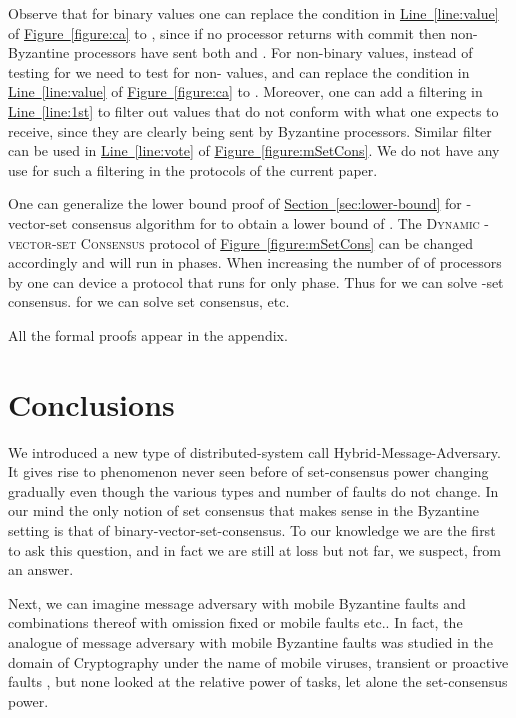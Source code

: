 \documentclass[11pt]{article}
\newcommand{\namedref}[2]{\hyperref[#2]{#1~\ref*{#2}}}
\newcommand{\sectionref}[1]{\namedref{Section}{#1}}
\newcommand{\figureref}[1]{\namedref{Figure}{#1}}
\newcommand{\lref}[1]{\namedref{Line}{#1}}
\newcommand{\mSetCons}{\textsc{Dynamic -vector-set Consensus}\xspace}
\begin{document}
Observe that for binary values one can replace the condition in \lref{line:value} of \figureref{figure:ca} to ,  since if  no processor returns with {\sc commit} then  non-Byzantine processors have sent both  and .  
For non-binary values, instead of testing for  we need to test for non- values,
and can replace the condition in \lref{line:value} of \figureref{figure:ca} to .
Moreover, 
one can  add a filtering  in \lref{line:1st}  to filter out values that do not conform with what one expects to receive, since they are clearly being sent by Byzantine processors.
Similar filter can be used in \lref{line:vote} of \figureref{figure:mSetCons}. 
We do not have any use for such a filtering in the protocols of the current paper.



One can generalize the lower bound proof of \sectionref{sec:lower-bound} for
-vector-set consensus algorithm for  to obtain a lower bound of .  
The \mSetCons protocol of
\figureref{figure:mSetCons} can be changed accordingly and will run in  phases. 
When increasing the number of of processors by  one can device a protocol that runs 
for only  phase.  Thus for  we can solve -set consensus.
for  we can solve  set consensus, etc. 



All the formal proofs appear in the appendix.






















 \section{Conclusions}

We introduced a new type of distributed-system call Hybrid-Message-Adversary.
It gives rise to phenomenon never seen before of set-consensus power changing gradually
even though the various types and number of faults do not change.
In our mind the only notion of set consensus that makes sense
in the Byzantine setting is that of binary-vector-set-consensus.
To our knowledge we are the first to ask this question, and in fact we
are still at loss but not far, we suspect, from an answer.

Next, we can imagine message adversary with mobile Byzantine faults
and combinations thereof with omission fixed or mobile faults etc..
In fact, the analogue of message adversary with mobile Byzantine faults
was studied in the domain of Cryptography under the name of mobile viruses, transient or proactive faults 
\cite{Ostrovsky:1991,Canetti1994,Rabin1998,Castro:2000},
but none looked at the relative power of tasks, let alone the set-consensus power.
\end{document}
